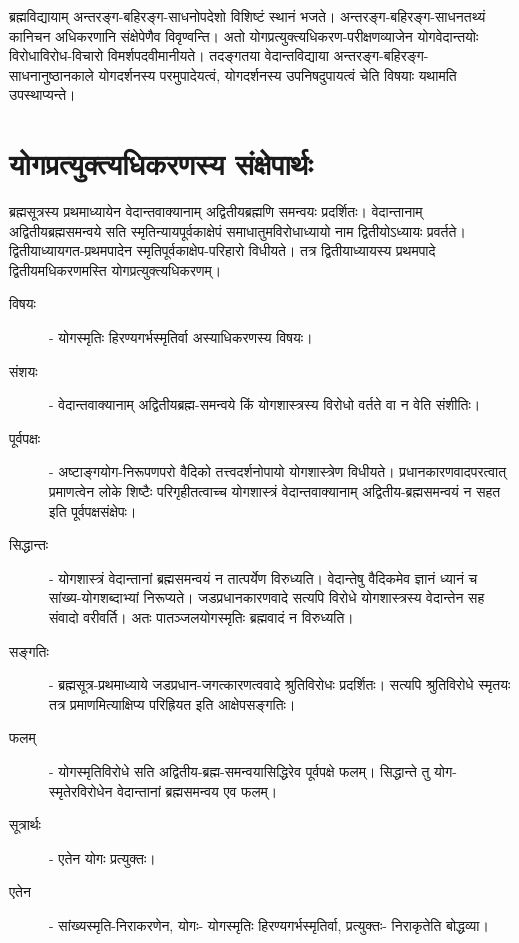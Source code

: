 {ब्रह्मविद्यायाम् अन्तरङ्ग-बहिरङ्ग-साधनोपदेशो विशिष्टं स्थानं भजते। अन्तरङ्ग-बहिरङ्ग-साधनतथ्यं कानिचन अधिकरणानि संक्षेपेणैव विवृण्वन्ति। अतो योगप्रत्युक्त्यधिकरण-परीक्षणव्याजेन योगवेदान्तयोः विरोधाविरोध-विचारो विमर्शपदवीमानीयते। तदङ्गतया वेदान्तविद्याया अन्तरङ्ग-बहिरङ्ग-साधनानुष्ठानकाले योगदर्शनस्य परमुपादेयत्वं, योगदर्शनस्य उपनिषदुपायत्वं चेति विषयाः यथामति उपस्थाप्यन्ते।

\section*{योगप्रत्युक्त्यधिकरणस्य संक्षेपार्थः}

ब्रह्मसूत्रस्य प्रथमाध्यायेन वेदान्तवाक्यानाम् अद्वितीयब्रह्मणि समन्वयः प्रदर्शितः। वेदान्तानाम् अद्वितीयब्रह्मसमन्वये सति स्मृतिन्यायपूर्वकाक्षेपं समाधातुमविरोधाध्यायो नाम द्वितीयोऽध्यायः प्रवर्तते। द्वितीयाध्यायगत-प्रथमपादेन स्मृतिपूर्वकाक्षेप-परिहारो विधीयते। तत्र द्वितीयाध्यायस्य प्रथमपादे द्वितीयमधिकरणमस्ति योगप्रत्युक्त्यधिकरणम्।

\begin{description}
\item[विषयः] - योगस्मृतिः हिरण्यगर्भस्मृतिर्वा अस्याधिकरणस्य विषयः।
\item[संशयः] - वेदान्तवाक्यानाम् अद्वितीयब्रह्म-समन्वये किं योगशास्त्रस्य विरोधो वर्तते वा न वेति संशीतिः।
\item[पूर्वपक्षः] - अष्टाङ्गयोग-निरूपणपरो वैदिको तत्त्वदर्शनोपायो योगशास्त्रेण विधीयते। प्रधानकारणवादपरत्वात् प्रमाणत्वेन लोके शिष्टैः परिगृहीतत्वाच्च योगशास्त्रं वेदान्तवाक्यानाम् अद्वितीय-ब्रह्मसमन्वयं न सहत इति पूर्वपक्षसंक्षेपः।
\item[सिद्धान्तः] - योगशास्त्रं वेदान्तानां ब्रह्मसमन्वयं न तात्पर्येण विरुध्यति। वेदान्तेषु वैदिकमेव ज्ञानं ध्यानं च सांख्य-योगशब्दाभ्यां निरूप्यते। जडप्रधानकारणवादे सत्यपि विरोधे योगशास्त्रस्य वेदान्तेन सह संवादो वरीवर्ति। अतः पातञ्जलयोगस्मृतिः ब्रह्मवादं न विरुध्यति।
\item[सङ्गतिः] - ब्रह्मसूत्र-प्रथमाध्याये जडप्रधान-जगत्कारणत्ववादे श्रुतिविरोधः प्रदर्शितः। सत्यपि श्रुतिविरोधे स्मृतयः तत्र प्रमाणमित्याक्षिप्य परिह्रियत इति आक्षेपसङ्गतिः।
\item[फलम्] - योगस्मृतिविरोधे सति अद्वितीय-ब्रह्म-समन्वयासिद्धिरेव पूर्वपक्षे फलम्। सिद्धान्ते तु योग-स्मृतेरविरोधेन वेदान्तानां ब्रह्मसमन्वय एव फलम्।
\item[सूत्रार्थः] - एतेन योगः प्रत्युक्तः।
\item[एतेन] - सांख्यस्मृति-निराकरणेन, योगः- योगस्मृतिः हिरण्यगर्भस्मृतिर्वा, प्रत्युक्तः- निराकृतेति बोद्धव्या।
\end{description}

}
